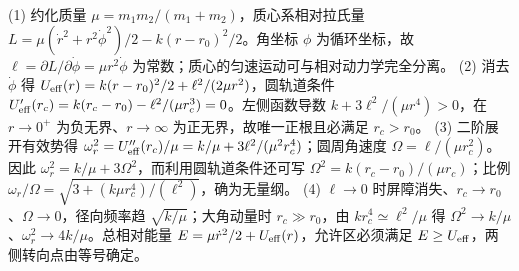 (1) 约化质量 \(\mu=m_1m_2/(m_1+m_2)\)，质心系相对拉氏量 \(L=\mu(\dot r^2+r^2\dot\phi^2)/2-k(r-r_0)^2/2\)。角坐标 \(\phi\) 为循环坐标，故 \(\ell=\partial L/\partial\dot\phi=\mu r^2\dot\phi\) 为常数；质心的匀速运动可与相对动力学完全分离。
(2) 消去 \(\dot\phi\) 得 \(U_{\rm eff}(r)=k(r-r_0)^2/2+\ell^2/(2\mu r^2)\)，圆轨道条件 \(U_{\rm eff}'(r_c)=k(r_c-r_0)-\ell^2/(\mu r_c^3)=0\)。左侧函数导数 \(k+3\ell^2/(\mu r^4)>0\)，在 \(r\to0^+\) 为负无界、\(r\to\infty\) 为正无界，故唯一正根且必满足 \(r_c>r_0\)。
(3) 二阶展开有效势得 \(\omega_r^2=U_{\rm eff}''(r_c)/\mu=k/\mu+3\ell^2/(\mu^2r_c^4)\)；圆周角速度 \(\Omega=\ell/(\mu r_c^2)\)。因此 \(\omega_r^2=k/\mu+3\Omega^2\)，而利用圆轨道条件还可写 \(\Omega^2=k(r_c-r_0)/(\mu r_c)\)；比例 \(\omega_r/\Omega=\sqrt{3+(k\mu r_c^4)/(\ell^2)}\)，确为无量纲。
(4) \(\ell\to0\) 时屏障消失、\(r_c\to r_0\)、\(\Omega\to0\)，径向频率趋 \(\sqrt{k/\mu}\)；大角动量时 \(r_c\gg r_0\)，由 \(kr_c^4\simeq\ell^2/\mu\) 得 \(\Omega^2\to k/\mu\)、\(\omega_r^2\to4k/\mu\)。总相对能量 \(E=\mu\dot r^2/2+U_{\rm eff}(r)\)，允许区必须满足 \(E\ge U_{\rm eff}\)，两侧转向点由等号确定。
